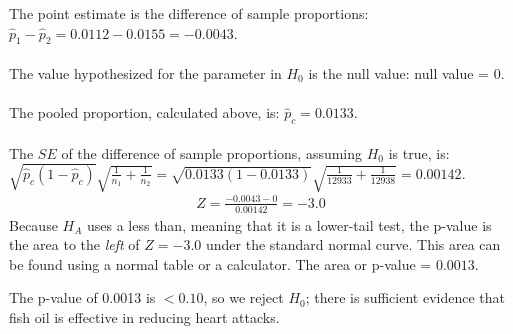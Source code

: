 \begin{examplewrap}
\begin{nexample}
\begin{description}
The point estimate is the difference of sample proportions: $\hat{p}_1-\hat{p}_2 = 0.0112 - 0.0155 = -0.0043.$\\
\\
The value hypothesized for the parameter in $H_0$ is the null value:  null value = 0.\\
\\
The pooled proportion, calculated above, is: $\hat{p}_c = 0.0133$.
\\
\\
The $SE$ of the difference of sample proportions, assuming $H_0$ is true, is: \\ $\sqrt{\hat{p}_c(1-\hat{p}_c)}\sqrt{\frac{1}{n_1} + \frac{1}{n_2}} = \sqrt{0.0133(1-0.0133)}\sqrt{\frac{1}{12933} + \frac{1}{12938}}=0.00142$. \\
\begin{align*}
Z = \frac{-0.0043 - 0}{0.00142} = -3.0
\end{align*}
Because $H_A$ uses a less than, meaning that it is a lower-tail test, the \mbox{p-value} is the area to the \emph{left} of $Z=-3.0$ under the standard normal curve.  This area can be found using a normal table or a calculator.  The area or p-value = $0.0013$.  
\item[\inferencestep{Conclude}]  The p-value of 0.0013 is $< 0.10$, so we reject $H_0$; there is sufficient evidence that fish oil is effective in reducing heart attacks.  
\end{description}
\end{nexample}
\end{examplewrap}


\D{\newpage}

